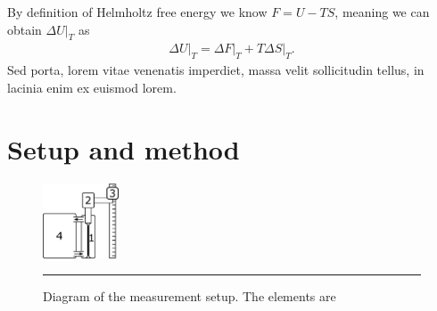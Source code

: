 \documentclass[
    a4paper,
    twocolumn,
    aps, pra,
    superscriptaddress,
    amsmath,amssymb
]{revtex4-2}
\theoremstyle{definition}
\newcommand{\DeltaF}{\left.\Delta F\right|_T}
\newcommand{\DeltaS}{\left.\Delta S\right|_T}
\newcommand{\DeltaU}{\left.\Delta U\right|_T}
\begin{document}
By definition of Helmholtz free energy we know $ F = U-TS $, meaning we can obtain $ \DeltaU $ as
\begin{align*}
\DeltaU = \DeltaF + T\DeltaS.
\end{align*}
Sed porta, lorem vitae venenatis imperdiet, massa velit sollicitudin tellus, in lacinia enim ex
euismod lorem.


\section{Setup and method}

\newsavebox{\setupExpl}

\begin{figure}[h]
	\centering
	\includegraphics[width=0.2\textwidth]{assets/OpstellingTekening1.pdf}
	\caption[Diagram of the measurement setup]{
        Diagram of the measurement setup. The elements are\newline
        \usebox{\setupExpl}}\label{fig:setupSchematic}
    \rule{0.5\linewidth}{1pt}
\end{figure}
\end{document}
